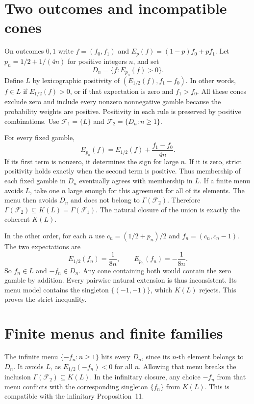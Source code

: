 \documentclass[11pt,a4paper]{amsart}
\begin{document}
\section{Two outcomes and incompatible cones}

On outcomes \(0,1\) write \(f=(f_0,f_1)\) and
\(E_p(f)=(1-p)f_0+pf_1\).
Let \(p_n=1/2+1/(4n)\) for positive integers \(n\), and set
\[
 D_n=\{f:E_{p_n}(f)>0\}.
\]
Define \(L\) by lexicographic positivity of
\((E_{1/2}(f),f_1-f_0)\). In other words, \(f\in L\) if
\(E_{1/2}(f)>0\), or if that expectation is zero and \(f_1>f_0\).
All these cones exclude zero and include every nonzero nonnegative
gamble because the probability weights are positive. Positivity
in each rule is preserved by positive combinations. Use
\(\mathcal F_1=\{L\}\) and \(\mathcal F_2=\{D_n:n\ge1\}\).

For every fixed gamble,
\[
 E_{p_n}(f)=E_{1/2}(f)+\frac{f_1-f_0}{4n}.
\]
If its first term is nonzero, it determines the sign for large
\(n\). If it is zero, strict positivity holds exactly when the
second term is positive. Thus membership of each fixed gamble in
\(D_n\) eventually agrees with membership in \(L\).
If a finite menu avoids \(L\), take one \(n\) large enough for this
agreement for all of its elements. The menu then avoids \(D_n\)
and does not belong to \(\Gamma(\mathcal F_2)\).
Therefore
\(\Gamma(\mathcal F_2)\subseteq K(L)=\Gamma(\mathcal F_1)\).
The natural closure of the union is exactly the coherent \(K(L)\).

In the other order, for each \(n\) use
\(c_n=(1/2+p_n)/2\) and \(f_n=(c_n,c_n-1)\).
The two expectations are
\[
 E_{1/2}(f_n)=\frac1{8n},\qquad
 E_{p_n}(f_n)=-\frac1{8n}.
\]
So \(f_n\in L\) and \(-f_n\in D_n\).
Any cone containing both would contain the zero gamble by
addition. Every pairwise natural extension is thus inconsistent.
Its menu model contains the singleton \(\{(-1,-1)\}\), which
\(K(L)\) rejects. This proves the strict inequality.

\section{Finite menus and finite families}

The infinite menu \(\{-f_n:n\ge1\}\) hits every \(D_n\), since
its \(n\)-th element belongs to \(D_n\). It avoids \(L\), as
\(E_{1/2}(-f_n)<0\) for all \(n\). Allowing that menu breaks the
inclusion \(\Gamma(\mathcal F_2)\subseteq K(L)\). In the
infinitary closure, any choice \(-f_n\) from that menu conflicts
with the corresponding singleton \(\{f_n\}\) from \(K(L)\).
This is compatible with the infinitary Proposition~11.
\end{document}
